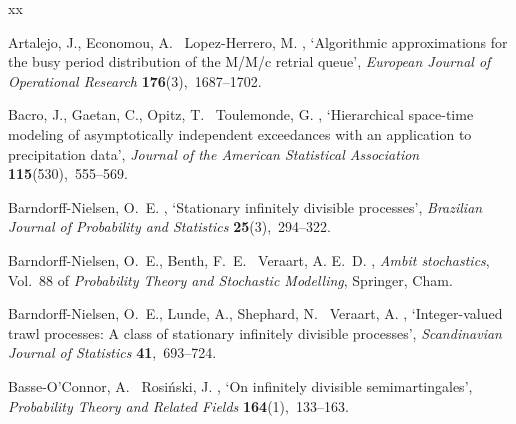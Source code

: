 \documentclass{article}
\theoremstyle{plain}
\theoremstyle{definition}
\theoremstyle{remark}
\begin{document}
\begin{thebibliography}{xx}

Artalejo, J., Economou, A. \harvardand\ Lopez-Herrero, M.  \harvardyearright , `Algorithmic approximations for the busy period distribution of the {M/M/c} retrial queue', {\em European Journal of Operational Research} {\bf 176}(3),~1687--1702.
\newline{}

Bacro, J., Gaetan, C., Opitz, T. \harvardand\ Toulemonde, G.  \harvardyearright , `Hierarchical space-time modeling of asymptotically independent exceedances with an application to precipitation data', {\em Journal of the American Statistical Association} {\bf 115}(530),~555--569.
\newline{}

Barndorff-Nielsen, O.~E.  \harvardyearright , `Stationary infinitely divisible processes', {\em Brazilian Journal of Probability and Statistics} {\bf 25}(3),~294--322.
\newline{}

Barndorff-Nielsen, O.~E., Benth, F.~E. \harvardand\ Veraart, A. E.~D.  \harvardyearright , {\em Ambit stochastics}, Vol.~88 of {\em Probability Theory and Stochastic Modelling}, Springer, Cham.
\newline{}

Barndorff-Nielsen, O.~E., Lunde, A., Shephard, N. \harvardand\ Veraart, A.  \harvardyearright , `Integer-valued trawl processes: A class of stationary infinitely divisible processes', {\em Scandinavian Journal of Statistics} {\bf 41},~693--724.
\newline{}

Basse-O'Connor, A. \harvardand\ Rosi{\'n}ski, J.  \harvardyearright , `On infinitely divisible semimartingales', {\em Probability Theory and Related Fields} {\bf 164}(1),~133--163.
\newline{}


\end{thebibliography}
\end{document}
